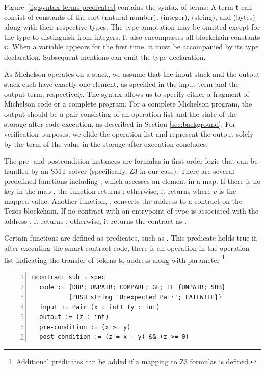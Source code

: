 \documentclass[runningheads]{llncs}
\begin{document}
Figure~\ref{fig:syntax-terms-predicates} contains the syntax of terms: A term \textbf{t} can consist of constants of the sort  (natural number),  (integer),  (string), and  (bytes) along with their respective types. The type annotation may be omitted except for the type  to distinguish from integers. It also encompasses all blockchain constants \textbf{c}. When a variable appears for the first time, it must be accompanied by its type declaration. Subsequent mentions can omit the type declaration.

As Michelson operates on a stack, we assume that the input stack and the output stack each have exactly one element, as specified in the input term and the output term, respectively. The syntax allows us to specify either a fragment of Michelson code or a complete program. For a complete Michelson program, the output should be a pair consisting of an operation list and the state of the storage after code execution,  as described in Section \ref{sec:background}. For verification purposes, we elide the operation list and represent the output solely by the term of the value in the storage after execution concludes. 

The pre- and postcondition instances are formulas in first-order logic that can be handled by an SMT solver (specifically, Z3 in our case). 
%
There are several predefined functions including , which accesses an element in a map. If there is no key  in the map , the function returns ; otherwise, it returns  where $v$ is the mapped value. Another function, , converts the address  to a contract on the Tezos blockchain. If no contract with an entrypoint of type  is associated with the address , it returns ; otherwise, it returns the contract as .

Certain functions are defined as predicates, such as . This predicate holds true if, after executing the smart contract code, there is an operation in the operation list indicating the transfer of  tokens to address  along with parameter \footnote{Additional predicates can be added if a mapping to Z3 formulas is defined.}.
\begin{lstlisting}[float,captionpos=b,caption={Specification of  the \lstinline/sub/ contract},label={lst:sub-contract-specification},numbers=left]
mcontract sub = spec
  code := {DUP; UNPAIR; COMPARE; GE; IF {UNPAIR; SUB} 
          {PUSH string 'Unexpected Pair'; FAILWITH}}
  input := Pair (x : int) (y : int)
  output := (z : int)
  pre-condition := (x >= y)
  post-condition := (z = x - y) && (z >= 0)
\end{lstlisting}
\end{document}
